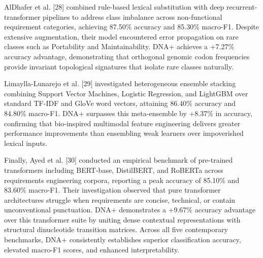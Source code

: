 AlDhafer et al. [28] combined rule-based lexical substitution with deep recurrent-transformer pipelines to address class imbalance across non-functional requirement categories, achieving 87.50\% accuracy and 85.30\% macro-F1. Despite extensive augmentation, their model encountered error propagation on rare classes such as Portability and Maintainability. DNA+ achieves a +7.27\% accuracy advantage, demonstrating that orthogonal genomic codon frequencies provide invariant topological signatures that isolate rare classes naturally.

Limaylla-Lunarejo et al. [29] investigated heterogeneous ensemble stacking combining Support Vector Machines, Logistic Regression, and LightGBM over standard TF-IDF and GloVe word vectors, attaining 86.40\% accuracy and 84.80\% macro-F1. DNA+ surpasses this meta-ensemble by +8.37\% in accuracy, confirming that bio-inspired multimodal feature engineering delivers greater performance improvements than ensembling weak learners over impoverished lexical inputs.

Finally, Ayed et al. [30] conducted an empirical benchmark of pre-trained transformers including BERT-base, DistilBERT, and RoBERTa across requirements engineering corpora, reporting a peak accuracy of 85.10\% and 83.60\% macro-F1. Their investigation observed that pure transformer architectures struggle when requirements are concise, technical, or contain unconventional punctuation. DNA+ demonstrates a +9.67\% accuracy advantage over this transformer suite by uniting dense contextual representations with structural dinucleotide transition matrices. Across all five contemporary benchmarks, DNA+ consistently establishes superior classification accuracy, elevated macro-F1 scores, and enhanced interpretability.
